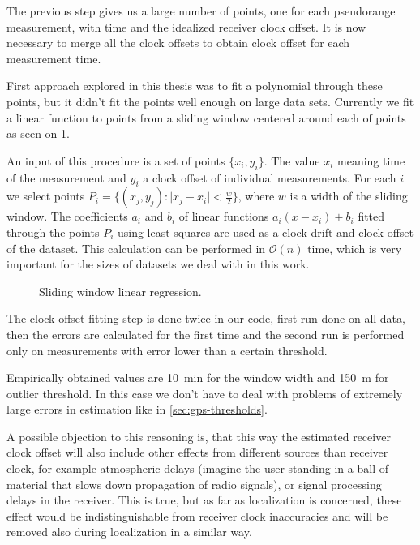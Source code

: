 The previous step gives us a large number of points, one for each pseudorange
measurement, with time and the idealized receiver clock offset.
It is now necessary to merge all the clock offsets to obtain clock offset for
each measurement time.

First approach explored in this thesis was to fit a polynomial through these
points, but it didn't fit the points well enough on large data sets.
Currently we fit a linear function to points from a sliding window centered
around each of points as seen on \cref{fig:sliding-window-linear-regression}.

An input of this procedure is a set of points \(\{x_i, y_i\}\).
The value \(x_i\) meaning time of the measurement and 
\(y_i\) a clock offset of individual measurements.
For each \(i\) we select points \(P_i = \{(x_j, y_j) : \lvert{}x_j - x_i\rvert < \frac{w}{2}\}\), where
\(w\) is a width of the sliding window.
The coefficients \(a_i\) and \(b_i\) of linear functions
\(a_i (x - x_i) + b_i\) fitted through the points \(P_i\) using least squares
are used as a clock drift and clock offset of the dataset.
This calculation can be performed in \(\mathcal{O}(n)\) time, which is very
important for the sizes of datasets we deal with in this work.


\begin{figure}[h]
	\centering
	
	\caption{Sliding window linear regression.}
	\label{fig:sliding-window-linear-regression}
\end{figure}

The clock offset fitting step is done twice in our code, first run done on
all data, then the errors are calculated for the first time and the second run
is performed only on measurements with error lower than a certain threshold.

Empirically obtained values are \SI{10}{\minute} for the window width and
\SI{150}{\meter} for outlier threshold.
In this case we don't have to deal with problems of extremely large errors in estimation
like in \cref{sec:gps-thresholds}.

A possible objection to this reasoning is, that this way the estimated
receiver clock offset will
also include other effects from different sources than receiver clock,
for example atmospheric delays (imagine the user standing in a ball of material
that slows down propagation of radio signals), or signal processing delays
in the receiver.
This is true, but as far as localization is concerned, these effect would
be indistinguishable from receiver clock inaccuracies and will be
removed also during localization in a similar way.

